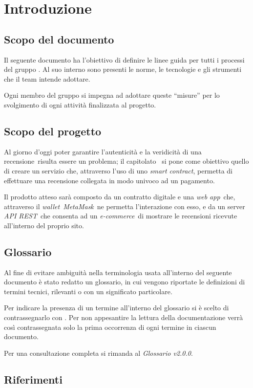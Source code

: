 \section{Introduzione}
\subsection{Scopo del documento}
Il seguente documento ha l'obiettivo di definire le linee guida per tutti i
processi del gruppo \groupName. Al suo interno sono presenti le norme, le
tecnologie e gli strumenti che il team intende adottare.

Ogni membro del
gruppo si impegna ad adottare queste “misure” per lo svolgimento di ogni
attività finalizzata al progetto.

\subsection{Scopo del progetto}
Al giorno d'oggi poter garantire l'autenticità e la veridicità di una
recensione\glo\ risulta essere un problema; il capitolato \capName\ si
pone come obiettivo quello di creare un servizio che, attraverso l'uso di uno
\textit{smart contract}\glo, permetta di effettuare una recensione collegata in
modo univoco ad un pagamento.

Il prodotto atteso sarà composto da un
contratto digitale e una \textit{web app}\glo\ che, attraverso il \textit{wallet}\glo\ \textit{MetaMask}\glo\, ne
permetta l'interazione con esso, e da un server \textit{API REST}\glo\ che consenta ad un
\textit{e-commerce}\glo\ di mostrare le recensioni ricevute all'interno del proprio sito.

\subsection{Glossario}
Al fine di evitare ambiguità nella terminologia usata all'interno del seguente
documento è stato redatto un glossario, in cui vengono riportate le definizioni
di termini tecnici, rilevanti o con un significato particolare.

Per indicare
la presenza di un termine all'interno del glossario si è scelto di
contrassegnarlo con \glo. Per non appesantire la lettura della documentazione
verrà così contrassegnata solo la prima occorrenza di ogni termine in ciascun
documento.

Per una consultazione completa si rimanda al \textit{Glossario v2.0.0}.

\subsection{Riferimenti}
